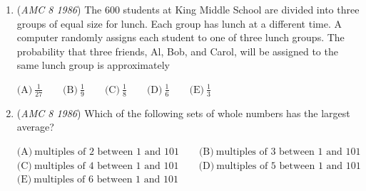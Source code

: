 \begin{enumerate}
	\item (\textit{AMC 8 1986}) The $600$ students at King Middle School are divided into three groups of equal size for lunch.  Each group has lunch at a different time.  A computer randomly assigns each student to one of three lunch groups.  The probability that three friends, Al, Bob, and Carol, will be assigned to the same lunch group is approximately


 $\text{(A)}\ \frac{1}{27} \qquad \text{(B)}\ \frac{1}{9} \qquad \text{(C)}\ \frac{1}{8} \qquad \text{(D)}\ \frac{1}{6} \qquad \text{(E)}\ \frac{1}{3}$


	\item (\textit{AMC 8 1986}) Which of the following sets of whole numbers has the largest average?


 $\text{(A)}\ \text{multiples of 2 between 1 and 101} \qquad \text{(B)}\ \text{multiples of 3 between 1 and 101}$
$\text{(C)}\ \text{multiples of 4 between 1 and 101} \qquad \text{(D)}\ \text{multiples of 5 between 1 and 101}$
$\text{(E)}\ \text{multiples of 6 between 1 and 101}$


\end{enumerate}